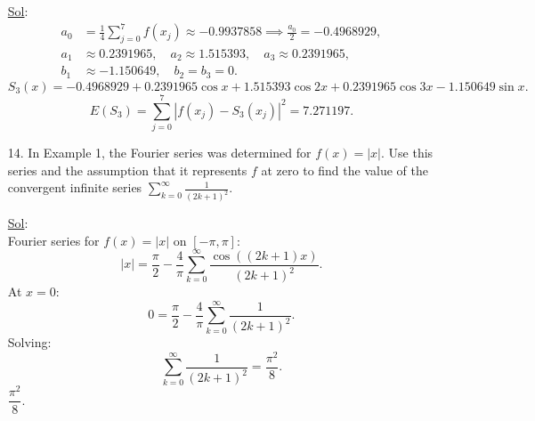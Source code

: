 \begin{enumerate}
    \underline{Sol}:\\
    \[
      \begin{aligned}
        a_0 &= \frac{1}{4} \sum_{j=0}^7 f(x_j) \approx -0.9937858
        \implies \frac{a_0}{2} = -0.4968929, \\
        a_1 &\approx 0.2391965, \quad a_2 \approx 1.515393, \quad a_3
        \approx 0.2391965, \\
        b_1 &\approx -1.150649, \quad b_2 = b_3 = 0.
      \end{aligned}
    \]
    \[
      S_3(x) = -0.4968929 + 0.2391965\cos x + 1.515393\cos 2x +
      0.2391965\cos 3x - 1.150649\sin x.
    \]
    \[
      E(S_3) = \sum_{j=0}^7 \left|f(x_j) - S_3(x_j)\right|^2 = \boxed{7.271197}.
    \]

  \item[14.] In Example 1, the Fourier series was determined for
    \(f(x) = |x|\). Use this series and the assumption that it
    represents \(f\) at zero to find the value of the convergent
    infinite series \(\sum_{k = 0}^{\infty} \frac{1}{(2k + 1)^2}\).

    \underline{Sol}:\\
    Fourier series for \( f(x) = |x| \) on \( [-\pi, \pi] \):
    \[
      |x| = \frac{\pi}{2} - \frac{4}{\pi} \sum_{k=0}^\infty
      \frac{\cos((2k+1)x)}{(2k+1)^2}.
    \]
    At \( x = 0 \):
    \[
      0 = \frac{\pi}{2} - \frac{4}{\pi} \sum_{k=0}^\infty \frac{1}{(2k+1)^2}.
    \]
    Solving:
    \[
      \sum_{k=0}^\infty \frac{1}{(2k+1)^2} = \frac{\pi^2}{8}.
    \]
    \(\boxed{\dfrac{\pi^2}{8}}\).
\end{enumerate}
